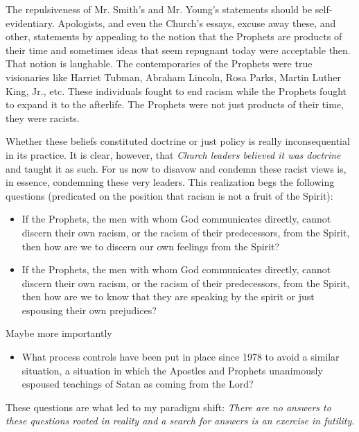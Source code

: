\documentclass[a4paper]{article}
\begin{document}
The repulsiveness of Mr. Smith's and Mr. Young's statements should be self-evidentiary.  Apologists, and even the Church's essays, excuse away these, and other, statements by appealing to the notion that the Prophets are products of their time and sometimes ideas that seem repugnant today were acceptable then.  That notion is laughable.  The contemporaries of the Prophets were true visionaries like Harriet Tubman, Abraham Lincoln, Rosa Parks, Martin Luther King, Jr., etc.  These individuals fought to end racism while the Prophets fought to expand it to the afterlife.  The Prophets were not just products of their time, they were racists.

Whether these beliefs constituted doctrine or just policy is really inconsequential in its practice.  It is clear, however, that \emph{Church leaders believed it was doctrine} and taught it as such.  For us now to disavow and condemn these racist views is, in essence, condemning these very leaders.  This realization begs the following questions (predicated on the position that racism is not a fruit of the Spirit):
%
\begin{itemize}

\item If the Prophets, the men with whom God communicates directly, cannot discern their own racism, or the racism of their predecessors, from the Spirit, then how are we to discern our own feelings from the Spirit?

\item If the Prophets, the men with whom God communicates directly, cannot discern their own racism, or the racism of their predecessors, from the Spirit, then how are we to know that they are speaking by the spirit or just espousing their own prejudices?

\end{itemize}

Maybe more importantly
%
\begin{itemize}

\item What process controls have been put in place since 1978 to avoid a similar situation, a situation in which the Apostles and Prophets unanimously espoused teachings of Satan as coming from the Lord?

\end{itemize}

These questions are what led to my paradigm shift: \emph{There are no answers to these questions rooted in reality and a search for answers is an exercise in futility}.
\end{document}
